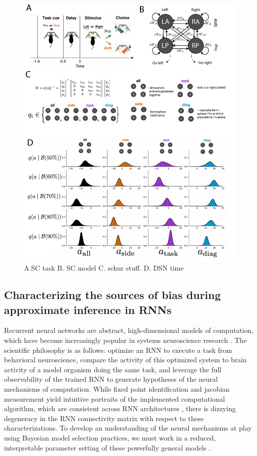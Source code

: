 \documentclass[11pt]{article}
\begin{document}
\begin{figure}
\begin{center}
\includegraphics[scale=0.4]{figs/fig4/fig4.pdf}
\end{center}
\caption{A.SC task B. SC model C. schur stuff. D. DSN time}
\end{figure}

\subsection{Characterizing the sources of bias during approximate inference in RNNs}
Recurrent neural networks are abstract, high-dimensional models of computation, which have become increasingly popular in systems neuroscience research \cite{sussillobarakpaper}.  The scientific philosophy is as follows: optimize an RNN to execute a task from behavioral neuroscience, compare the activity of this optimized system to brain activity of a model organism doing the same task, and leverage the full observability of the trained RNN to generate hypotheses of the neural mechanisms of computation.  While fixed point identification and jacobian measurement yield intuitive portraits of the implemented computational algorithm, which are consistent across RNN architectures \cite{universality2019Maheswaranathan}, there is dizzying degeneracy in the RNN connectivity matrix with respect to these characterizations.  To develop an understanding of the neural mechanisms at play using Bayesian model selection practices, we must work in a reduced, interpretable parameter setting of these powerfully general models \cite{doya1993universality}.
\end{document}
